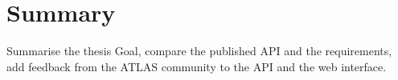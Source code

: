 \chapter{Summary}
\label{chap:summary}
Summarise the thesis Goal, compare the published API and the requirements, add feedback from the ATLAS community to the API and the web interface.